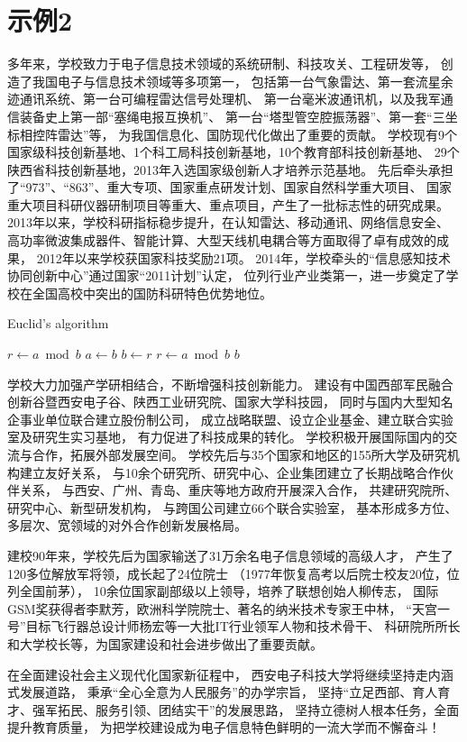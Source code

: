 \section{示例2}
多年来，学校致力于电子信息技术领域的系统研制、科技攻关、工程研发等，
创造了我国电子与信息技术领域等多项第一，
包括第一台气象雷达、第一套流星余迹通讯系统、第一台可编程雷达信号处理机、
第一台毫米波通讯机，以及我军通信装备史上第一部“塞绳电报互换机”、
第一台“塔型管空腔振荡器”、第一套“三坐标相控阵雷达”等，
为我国信息化、国防现代化做出了重要的贡献。
学校现有9个国家级科技创新基地、1个科工局科技创新基地，10个教育部科技创新基地、
29个陕西省科技创新基地，2013年入选国家级创新人才培养示范基地。
先后牵头承担了“973”、“863”、重大专项、国家重点研发计划、国家自然科学重大项目、
国家重大项目科研仪器研制项目等重大、重点项目，产生了一批标志性的研究成果。
2013年以来，学校科研指标稳步提升，在认知雷达、移动通讯、网络信息安全、
高功率微波集成器件、智能计算、大型天线机电耦合等方面取得了卓有成效的成果，
2012年以来学校获国家科技奖励21项。
2014年，学校牵头的“信息感知技术协同创新中心”通过国家“2011计划”认定，
位列行业产业类第一，进一步奠定了学校在全国高校中突出的国防科研特色优势地位。
\begin{algorithm}
\caption{Euclid's algorithm}\label{euclid}
\begin{algorithmic}[1]
\State $r\gets a\bmod b$
\State $a\gets b$
\State $b\gets r$
\State $r\gets a\bmod b$
\EndWhile\label{euclidendwhile}
\State \Return $b$
\EndProcedure
\end{algorithmic}
\end{algorithm}
\par
学校大力加强产学研相结合，不断增强科技创新能力。
建设有中国西部军民融合创新谷暨西安电子谷、陕西工业研究院、国家大学科技园，
同时与国内大型知名企事业单位联合建立股份制公司，
成立战略联盟、设立企业基金、建立联合实验室及研究生实习基地，
有力促进了科技成果的转化。
学校积极开展国际国内的交流与合作，拓展外部发展空间。
学校先后与35个国家和地区的155所大学及研究机构建立友好关系，
与10余个研究所、研究中心、企业集团建立了长期战略合作伙伴关系，
与西安、广州、青岛、重庆等地方政府开展深入合作，
共建研究院所、研究中心、新型研发机构，
与跨国公司建立66个联合实验室，
基本形成多方位、多层次、宽领域的对外合作创新发展格局。
\par
建校90年来，学校先后为国家输送了31万余名电子信息领域的高级人才，
产生了120多位解放军将领，成长起了24位院士
（1977年恢复高考以后院士校友20位，位列全国前茅），
10余位国家副部级以上领导，培养了联想创始人柳传志，
国际GSM奖获得者李默芳，欧洲科学院院士、著名的纳米技术专家王中林，
“天宫一号”目标飞行器总设计师杨宏等一大批IT行业领军人物和技术骨干、
科研院所所长和大学校长等，为国家建设和社会进步做出了重要贡献。
\par
在全面建设社会主义现代化国家新征程中，
西安电子科技大学将继续坚持走内涵式发展道路，
秉承“全心全意为人民服务”的办学宗旨，
坚持“立足西部、育人育才、强军拓民、服务引领、团结实干”的发展思路，
坚持立德树人根本任务，全面提升教育质量，
为把学校建设成为电子信息特色鲜明的一流大学而不懈奋斗！

